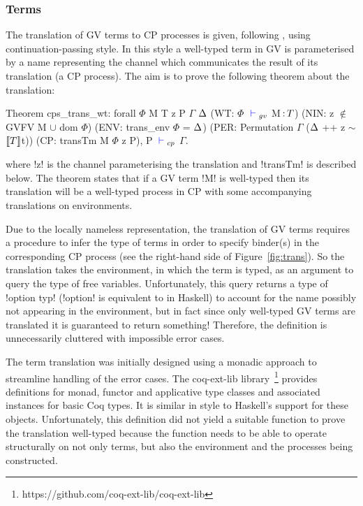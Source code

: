 \subsubsection{Terms}



The translation of GV terms to CP processes is given, following
\citeauthor{Wadler:2014}, using continuation-passing style. In this style a
well-typed term in GV is parameterised by a name representing the channel
which communicates the result of its translation (a CP process). The aim is to
prove the following theorem about the translation:
\begin{coq}
Theorem cps_trans_wt:
  forall $\Phi$ M T z P $\Gamma$ $\Delta$
         (WT: $\Phi$ ${\color{blue} {} \vdash {}}_{gv}$ M$\,{:}\,{T}$)
         (NIN: z $\notin$ GVFV M $\cup$ dom $\Phi$)
         (ENV: trans_env $\Phi$ = $\Delta$)
         (PER: Permutation $\Gamma$ ($\Delta$ ++ z $\sim$ $\llbracket T \rrbracket$t))
         (CP: transTm M $\Phi$ z P),
    P ${\color{blue} {} \vdash {}}_{cp}$ $\Gamma$.
\end{coq}
where \coqe!z! is the channel parameterising the translation and
\coqe!transTm! is described below. The theorem states that if a GV term
\coqe!M! is well-typed then its translation will be a well-typed process in CP
with some accompanying translations on environments.

Due to the locally nameless representation, the translation of GV terms
requires a procedure to infer the type of terms in order to specify binder(s)
in the corresponding CP process (see the right-hand side of
Figure~\ref{fig:trans}). So the translation takes the environment, in which
the term is typed, as an argument to query the type of free
variables. Unfortunately, this query returns a type of \coqe!option typ!
(\coqe!option! is equivalent to  in Haskell) to account for the name
possibly not appearing in the environment, but in fact since only well-typed
GV terms are translated it is guaranteed to return something! Therefore, the
definition is unnecessarily cluttered with impossible error cases.

The term translation was initially designed using a monadic approach to
streamline handling of the error cases. The coq-ext-lib
library~\footnote{https://github.com/coq-ext-lib/coq-ext-lib} provides
definitions for monad, functor and applicative type classes and associated
instances for basic Coq types. It is similar in style to Haskell's support for
these objects. Unfortunately, this definition did not yield a suitable
function to prove the translation well-typed because the function needs to be
able to operate structurally on not only terms, but also the environment and
the processes being constructed.

